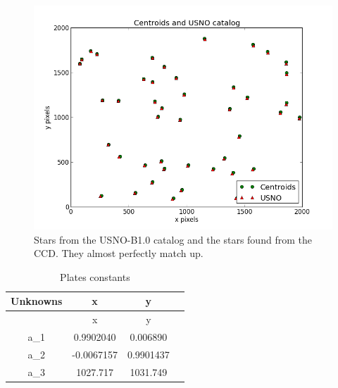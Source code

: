 \documentclass[letterpaper,12pt]{article}
\begin{document}
\FloatBarrier
\begin{figure}[h!]
\centering
\includegraphics[scale=0.5]{centroids_catalog_together.png}
\caption{Stars from the USNO-B1.0 catalog and the stars found from the CCD. They almost perfectly match up.}
\end{figure}
\FloatBarrier




\FloatBarrier
\begin{table}[h!]
\caption{Plates constants} %
\centering %
\begin{tabular}{c c c c } %
\hline\hline %
Unknowns & x & y \\ [0.5ex] %
\hline %
         & x  & y\\ %
a_{1} &   0.9902040  & 0.006890  \\
a_{2} &  -0.0067157  & 0.9901437 \\
a_{3} &  1027.717     & 1031.749\\[1ex] %
\hline %
\end{tabular}
\label{table:nonlin} %
\end{table}
\FloatBarrier








\end{document}
